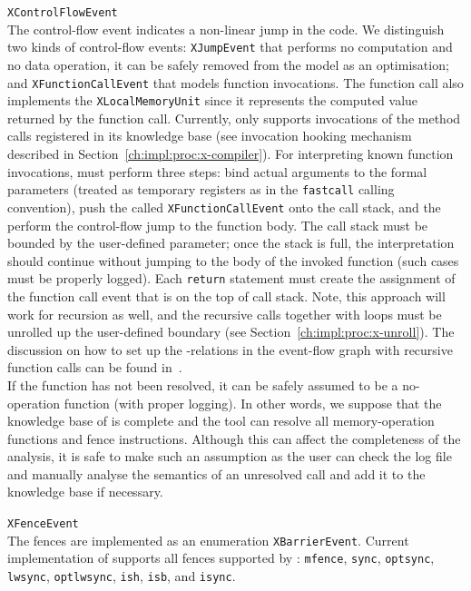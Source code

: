\begin{outline}
  \1 \texttt{XControlFlowEvent} \\
    The control-flow event indicates a non-linear jump in the code. We distinguish two kinds of control-flow events: 
    \2 \texttt{XJumpEvent} that performs no computation and no data operation, it can be safely removed from the model as an optimisation; and
    \2 \texttt{XFunctionCallEvent} that models function invocations.
    The function call also implements the \texttt{XLocalMemoryUnit} since it represents the computed value returned by the function call.
    Currently, \porthos[2] only supports invocations of the method calls registered in its knowledge base (see invocation hooking mechanism described in Section~\ref{ch:impl:proc:x-compiler}).
    For interpreting known function invocations, \porthos[2] must perform three steps: bind actual arguments to the formal parameters (treated as temporary registers as in the \texttt{fastcall} calling convention), push the called \texttt{XFunctionCallEvent} onto the call stack, and the perform the control-flow jump to the function body.
    The call stack must be bounded by the user-defined parameter; once the stack is full, the interpretation should continue without jumping to the body of the invoked function (such cases must be properly logged).
    Each \texttt{return} statement must create the assignment of the function call event that is on the top of call stack.
    Note, this approach will work for recursion as well, and the recursive calls together with loops must be unrolled up the user-defined boundary (see Section~\ref{ch:impl:proc:x-unroll}).
    The discussion on how to set up the \po-relations in the event-flow graph with recursive function calls can be found in~\cite{musketeer2014recursion}.
    \\
    If the function has not been resolved, it can be safely assumed to be a no-operation function (with proper logging).
    In other words, we suppose that the knowledge base of \porthos[2] is complete and the tool can resolve all memory-operation functions and fence instructions.
    Although this can affect the completeness of the analysis, it is safe to make such an assumption as the user can check the log file and manually analyse the semantics of an unresolved call and add it to the knowledge base if necessary.

  \1 \texttt{XFenceEvent} \\
    The fences are implemented as an enumeration \texttt{XBarrierEvent}.
    Current implementation of \porthos[2] supports all fences supported by \porthos{}: 
    \texttt{mfence}, \texttt{sync}, \texttt{optsync}, \texttt{lwsync}, \texttt{optlwsync}, \texttt{ish}, \texttt{isb}, and \texttt{isync}.
    

\end{outline}
